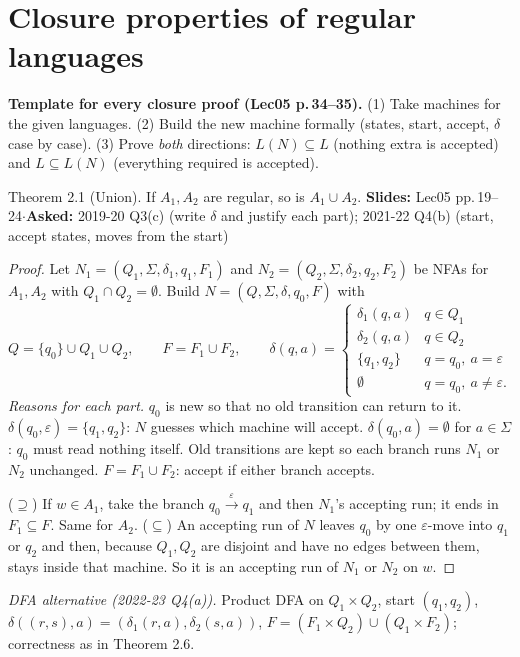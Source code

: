 \documentclass[10.5pt,a4paper]{article}
\newcommand{\src}[2]{{\footnotesize\color{gray!70!black}\textbf{Slides:} #1\enspace$\cdot$\enspace\textbf{Asked:} #2}\par}
\newcommand{\eps}{\varepsilon}
\begin{document}
\section{Closure properties of regular languages}

\begin{trap}\textbf{Template for every closure proof (Lec05 p.\,34--35).} (1) Take machines for the given languages. (2) Build the new machine
formally (states, start, accept, $\delta$ case by case). (3) Prove \emph{both} directions: $L(N)\subseteq L$ (nothing extra is accepted)
and $L\subseteq L(N)$ (everything required is accepted).\end{trap}

\begin{thm}{Theorem 2.1 (Union). If $A_1,A_2$ are regular, so is $A_1\cup A_2$.}
\src{Lec05 pp.\,19--24}{2019-20 Q3(c) (write $\delta$ and justify each part); 2021-22 Q4(b) (start, accept states, moves from the start)}
\end{thm}
\begin{proof}
Let $N_1=(Q_1,\Sigma,\delta_1,q_1,F_1)$ and $N_2=(Q_2,\Sigma,\delta_2,q_2,F_2)$ be NFAs for $A_1,A_2$ with $Q_1\cap Q_2=\emptyset$.
Build $N=(Q,\Sigma,\delta,q_0,F)$ with
\[Q=\{q_0\}\cup Q_1\cup Q_2,\qquad F=F_1\cup F_2,\qquad
\delta(q,a)=\begin{cases}
\delta_1(q,a) & q\in Q_1\\
\delta_2(q,a) & q\in Q_2\\
\{q_1,q_2\} & q=q_0,\ a=\eps\\
\emptyset & q=q_0,\ a\ne\eps.
\end{cases}\]
\emph{Reasons for each part.} $q_0$ is new so that no old transition can return to it. $\delta(q_0,\eps)=\{q_1,q_2\}$: $N$ guesses which
machine will accept. $\delta(q_0,a)=\emptyset$ for $a\in\Sigma$: $q_0$ must read nothing itself. Old transitions are kept so each branch
runs $N_1$ or $N_2$ unchanged. $F=F_1\cup F_2$: accept if either branch accepts.

($\supseteq$) If $w\in A_1$, take the branch $q_0\xrightarrow{\eps}q_1$ and then $N_1$'s accepting run; it ends in $F_1\subseteq F$.
Same for $A_2$. ($\subseteq$) An accepting run of $N$ leaves $q_0$ by one $\eps$-move into $q_1$ or $q_2$ and then, because $Q_1,Q_2$ are
disjoint and have no edges between them, stays inside that machine. So it is an accepting run of $N_1$ or $N_2$ on $w$.
\end{proof}
\emph{DFA alternative (2022-23 Q4(a)).} Product DFA on $Q_1\times Q_2$, start $(q_1,q_2)$,
$\delta((r,s),a)=(\delta_1(r,a),\delta_2(s,a))$, $F=(F_1\times Q_2)\cup(Q_1\times F_2)$; correctness as in Theorem 2.6.
\end{document}
